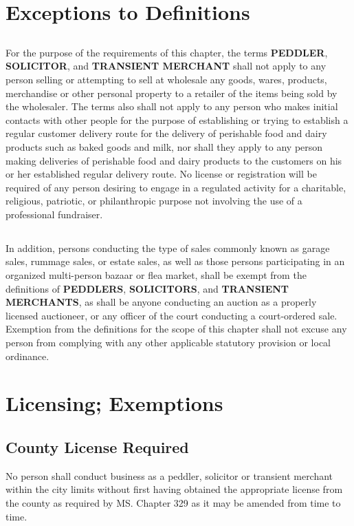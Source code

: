 \section{Exceptions to Definitions}
\subsection{}
For the purpose of the requirements of this chapter, the terms \textbf{PEDDLER}, \textbf{SOLICITOR}, and \textbf{TRANSIENT MERCHANT} shall not apply to any person selling or attempting to sell at wholesale any goods, wares, products, merchandise or other personal property to a retailer of the items being sold by the wholesaler. The terms also shall not apply to any person who makes initial contacts with other people for the purpose of establishing or trying to establish a regular customer delivery route for the delivery of perishable food and dairy products such as baked goods and milk, nor shall they apply to any person making deliveries of perishable food and dairy products to the customers on his or her established regular delivery route. No license or registration will be required of any person desiring to engage in a regulated activity for a charitable, religious, patriotic, or philanthropic purpose not involving the use of a professional fundraiser.
\subsection{}
In addition, persons conducting the type of sales commonly known as garage sales, rummage sales, or estate sales, as well as those persons participating in an organized multi-person bazaar or flea market, shall be exempt from the definitions of \textbf{PEDDLERS}, \textbf{SOLICITORS}, and \textbf{TRANSIENT MERCHANTS}, as shall be anyone conducting an auction as a properly licensed auctioneer, or any officer of the court conducting a court-ordered sale. Exemption from the definitions for the scope of this chapter shall not excuse any person from complying with any other applicable statutory provision or local ordinance.

\section{Licensing; Exemptions}
\subsection{County License Required}
No person shall conduct business as a peddler, solicitor or transient merchant within the city limits without first having obtained the appropriate license from the county as required by MS. Chapter 329 as it may be amended from time to time.
